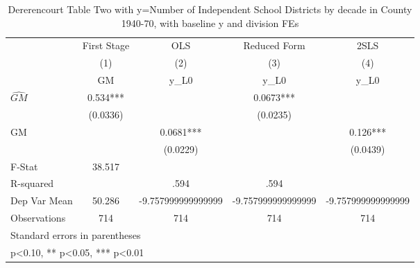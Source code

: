 \begin{table}[htbp]\centering
\def\sym#1{\ifmmode^{#1}\else\(^{#1}\)\fi}
\caption{Dererencourt Table Two with y=Number of Independent School Districts by decade in County 1940-70, with baseline y and division FEs}
\begin{tabular}{l*{4}{c}}
\toprule
                    & First Stage   &         OLS   &Reduced Form   &        2SLS   \\
                    &\multicolumn{1}{c}{(1)}&\multicolumn{1}{c}{(2)}&\multicolumn{1}{c}{(3)}&\multicolumn{1}{c}{(4)}\\
                    &\multicolumn{1}{c}{GM}&\multicolumn{1}{c}{y\_L0}&\multicolumn{1}{c}{y\_L0}&\multicolumn{1}{c}{y\_L0}\\
\midrule
$\hat{GM}$          &       0.534***&               &      0.0673***&               \\
                    &    (0.0336)   &               &    (0.0235)   &               \\
\addlinespace
GM                  &               &      0.0681***&               &       0.126***\\
                    &               &    (0.0229)   &               &    (0.0439)   \\
\midrule
F-Stat              &      38.517   &               &               &               \\
R-squared           &               &        .594   &        .594   &               \\
Dep Var Mean        &      50.286   &-9.757999999999999   &-9.757999999999999   &-9.757999999999999   \\
Observations        &         714   &         714   &         714   &         714   \\
\bottomrule
\multicolumn{5}{l}{\footnotesize Standard errors in parentheses}\\
\multicolumn{5}{l}{\footnotesize * p<0.10, ** p<0.05, *** p<0.01}\\
\end{tabular}
\end{table}
